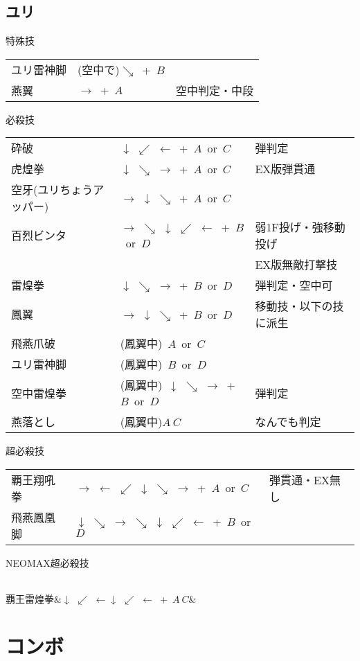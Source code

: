 \documentclass[a4j,11pt]{jarticle}
\def\hado{$\downarrow$ $\searrow$ $\rightarrow$}%
\def\tatsu{$\downarrow$ $\swarrow$ $\leftarrow$}%
\def\syoryu{$\rightarrow$ $\downarrow$ $\searrow$}%
\def\yoga{$\leftarrow$ $\swarrow$ $\downarrow$ $\searrow$ $\rightarrow$}%
\def\gyakuyoga{$\rightarrow$ $\searrow$ $\downarrow$ $\swarrow$ $\leftarrow$}%
\def\ryuko{$\downarrow$ $\searrow$ $\rightarrow$ $\searrow$ $\downarrow$ $\swarrow$ $\leftarrow$}%
\begin{document}
\subsection{ユリ}
\begin{itembox}[l]{特殊技}
\begin{tabular}{lll}
ユリ雷神脚&(空中で)$\searrow$\ +\ $B$&\\%
燕翼&$\rightarrow$\ +\ $A$&空中判定・中段
\end{tabular}
\end{itembox}
\begin{itembox}[l]{必殺技}
\begin{tabular}{lll}
砕破&\tatsu\ +\ $A$\ or\ $C$&弾判定\\%
虎煌拳&\hado\ +\ $A$\ or\ $C$&EX版弾貫通\\%
空牙(ユリちょうアッパー)&\syoryu\ +\ $A$\ or\ $C$&\\%
百烈ビンタ&\gyakuyoga\ +\ $B$\ or\ $D$&弱1F投げ・強移動投げ\\
&&EX版無敵打撃技\\%
雷煌拳&\hado\ +\ $B$\ or\ $D$&弾判定・空中可\\%
鳳翼&\syoryu\ +\ $B$\ or\ $D$&移動技・以下の技に派生\\%
飛燕爪破&(鳳翼中)\ $A$\ or\ $C$&\\%
ユリ雷神脚&(鳳翼中)\ $B$\ or\ $D$&\\%
空中雷煌拳&(鳳翼中)\ \hado\ +\ $B$\ or\ $D$&弾判定\\%
燕落とし&(鳳翼中)$A\ C$&なんでも判定%
\end{tabular}
\end{itembox}
\begin{itembox}[l]{超必殺技}
\begin{tabular}{lll}
覇王翔吼拳&$\rightarrow$ \yoga\ +\ $A$\ or\ $C$&弾貫通・EX無し\\%
飛燕鳳凰脚&\ryuko\ +\ $B$\ or\ $D$&%
\end{tabular}
\end{itembox}
\begin{itembox}[l]{NEOMAX超必殺技}
\begin{tabular}{lll}
\end{tabular}
覇王雷煌拳&\tatsu\tatsu\ +\ $A\ C$&%
\end{itembox}
\newpage
\section{コンボ}
\end{document}
